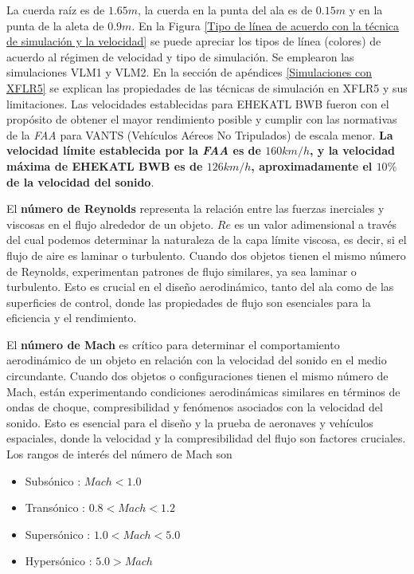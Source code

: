 La cuerda raíz es de $1.65m$, la cuerda en la punta del ala es de $0.15m$ y en la punta de la aleta de $0.9m$.
%
En la Figura \ref{Tipo de línea de acuerdo con la técnica de simulación y la velocidad} se puede apreciar los tipos de línea (colores) de acuerdo al régimen de velocidad y tipo de simulación. Se emplearon las simulaciones VLM1 y VLM2. En la sección de apéndices \ref{Simulaciones con XFLR5} se explican las propiedades de las técnicas de simulación en XFLR5 y sus limitaciones.
Las velocidades establecidas para EHEKATL BWB fueron con el propósito de obtener el mayor rendimiento posible y cumplir con las normativas de la \textit{FAA} para VANTS (Vehículos Aéreos No Tripulados) de escala menor. 
\textbf{La velocidad límite establecida por la \textit{FAA} es de $160km/h$, y la velocidad máxima de EHEKATL BWB es de $126km/h$, aproximadamente el $10\%$ de la velocidad del sonido}.



El \textbf{número de Reynolds} representa la relación entre las fuerzas inerciales y viscosas en el flujo alrededor de un objeto. $Re$ es un valor adimensional a través del cual podemos determinar la naturaleza de la capa límite viscosa, es decir, si el flujo de aire es laminar o turbulento. Cuando dos objetos tienen el mismo número de Reynolds, experimentan patrones de flujo similares, ya sea laminar o turbulento. Esto es crucial en el diseño aerodinámico, tanto del ala como de las superficies de control, donde las propiedades de flujo son esenciales para la eficiencia y el rendimiento.

El \textbf{número de Mach} es crítico para determinar el comportamiento aerodinámico de un objeto en relación con la velocidad del sonido en el medio circundante. Cuando dos objetos o configuraciones tienen el mismo número de Mach, están experimentando condiciones aerodinámicas similares en términos de ondas de choque, compresibilidad y fenómenos asociados con la velocidad del sonido. Esto es esencial para el diseño y la prueba de aeronaves y vehículos espaciales, donde la velocidad y la compresibilidad del flujo son factores cruciales.
Los rangos de interés del número de Mach son
\begin{itemize}
    \item Subsónico : $Mach < 1.0$
    \item Transónico : $0.8 < Mach < 1.2$
    \item Supersónico : $1.0 < Mach < 5.0$
    \item Hypersónico : $5.0 > Mach$
\end{itemize}

